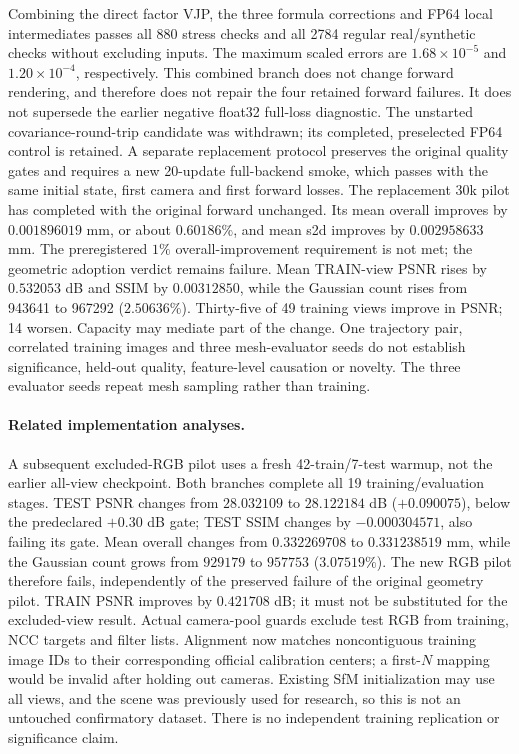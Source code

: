 \documentclass[11pt,a4paper]{article}
\begin{document}
Combining the direct factor VJP, the three formula corrections and
FP64 local intermediates passes all 880 stress checks and all 2784
regular real/synthetic checks without excluding inputs. The maximum
scaled errors are $1.68\times10^{-5}$ and $1.20\times10^{-4}$,
respectively. This combined branch does not change forward rendering,
and therefore does not repair the four retained forward failures.
It does not supersede the earlier negative float32 full-loss diagnostic.
The unstarted covariance-round-trip candidate was withdrawn; its
completed, preselected FP64 control is retained. A separate replacement
protocol preserves the original quality gates and requires a new
20-update full-backend smoke, which passes with the same initial state,
first camera and first forward losses. The replacement 30k pilot has
completed with the original forward unchanged. Its mean overall improves
by $0.001896019$ mm, or about $0.60186\%$, and mean s2d improves by
$0.002958633$ mm. The preregistered $1\%$ overall-improvement requirement
is not met; the geometric adoption verdict remains failure.
Mean TRAIN-view PSNR rises by $0.532053$ dB and SSIM by $0.00312850$,
while the Gaussian count rises from 943641 to 967292 ($2.50636\%$).
Thirty-five of 49 training views improve in PSNR; 14 worsen.
Capacity may mediate part of the change. One trajectory pair, correlated
training images and three mesh-evaluator seeds do not establish
significance, held-out quality, feature-level causation or novelty.
The three evaluator seeds repeat mesh sampling rather than training.

\paragraph{Related implementation analyses.}
A subsequent excluded-RGB pilot uses a fresh 42-train/7-test warmup,
not the earlier all-view checkpoint. Both branches complete all 19
training/evaluation stages. TEST PSNR changes from $28.032109$ to
$28.122184$ dB ($+0.090075$), below the predeclared $+0.30$ dB gate;
TEST SSIM changes by $-0.000304571$, also failing its gate.
Mean overall changes from $0.332269708$ to $0.331238519$ mm, while the
Gaussian count grows from $929179$ to $957753$ ($3.07519\%$).
The new RGB pilot therefore fails, independently of the preserved
failure of the original geometry pilot. TRAIN PSNR improves by
$0.421708$ dB; it must not be substituted for the excluded-view result.
Actual camera-pool guards exclude test RGB from training, NCC targets
and filter lists. Alignment now matches noncontiguous training image
IDs to their corresponding official calibration centers; a first-$N$
mapping would be invalid after holding out cameras. Existing SfM
initialization may use all views, and the scene was previously used
for research, so this is not an untouched confirmatory dataset.
There is no independent training replication or significance claim.
\end{document}
